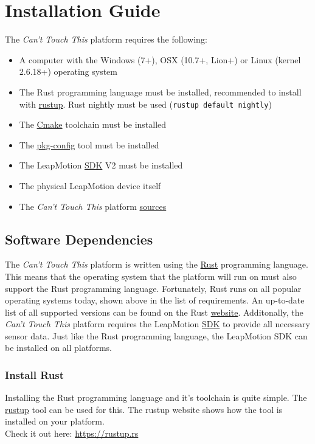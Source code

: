 \documentclass{standalone}
\begin{document}
  \section{Installation Guide}
  The \textit{Can't Touch This} platform requires the following:
  \begin{itemize}
    \tightlist{}
    \item A computer with the Windows (7+), OSX (10.7+, Lion+) or
      Linux (kernel 2.6.18+) operating system
    \item The Rust programming language must be installed, recommended to
      install with \href{https://rustup.rs}{rustup}. Rust nightly must be used
      (\verb_rustup default nightly_)
    \item The \href{https://cmake.org/}{Cmake} toolchain must be installed
    \item The \href{https://freedesktop.org/wiki/Software/pkg-config}{pkg-config} tool must be installed
    \item The LeapMotion
      \href{https://developer.leapmotion.com/sdk/v2}{SDK} V2 must be installed
    \item The physical LeapMotion device itself
    \item The \textit{Can't Touch This} platform
      \href{https://gitlab.com/timvisee/cant-touch-this.git}{sources}
  \end{itemize}

  \subsection{Software Dependencies}
  The \textit{Can't Touch This} platform is written using the
  \href{https://rust-lang.org}{Rust} programming language. This means that the
  operating system that the platform will run on must also support the Rust
  programming language. Fortunately, Rust runs on all popular operating systems
  today, shown above in the list of requirements. An up-to-date list of all
  supported versions can be found on the Rust
  \href{https://forge.rust-lang.org/platform-support.html}{website}.
  Additonally, the \textit{Can't Touch This} platform requires the LeapMotion
  \href{https://developer.leapmotion.com/sdk/v2}{SDK} to provide all necessary
  sensor data. Just like the Rust programming language, the LeapMotion SDK can
  be installed on all platforms.

  \subsubsection{Install Rust}
  Installing the Rust programming language and it's toolchain is quite simple.
  The \href{https://rustup.rs}{rustup} tool can be used for this. The rustup
  website shows how the tool is installed on your platform.\\
  Check it out here: \url{https://rustup.rs}
\end{document}
